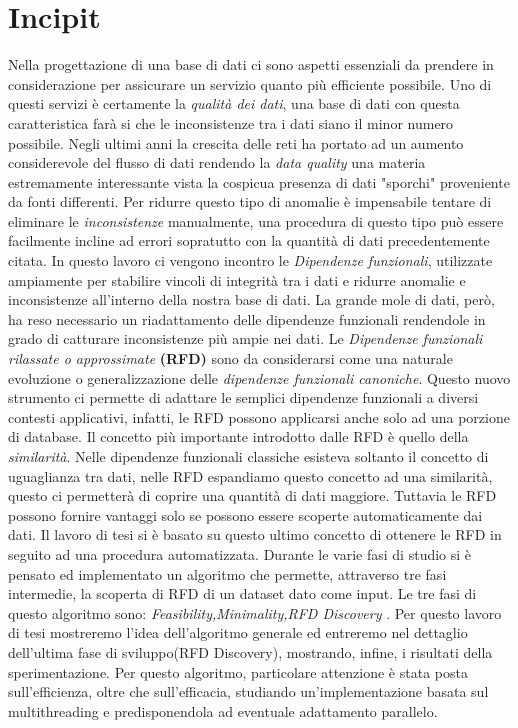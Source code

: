 \section{Incipit}
Nella progettazione di una base di dati ci sono aspetti essenziali da prendere in considerazione per assicurare un servizio quanto più efficiente possibile.
Uno di questi servizi è certamente la \emph{qualità dei dati}, una base di dati con questa caratteristica farà si che le inconsistenze tra i dati siano il minor numero possibile.
Negli ultimi anni la crescita delle reti ha portato ad un aumento considerevole del flusso di dati  rendendo la \emph{data quality} una materia estremamente interessante vista la cospicua presenza di dati "sporchi" proveniente da fonti differenti.
Per ridurre questo tipo di anomalie è impensabile tentare di eliminare le \emph{inconsistenze} manualmente,  una procedura di questo tipo può essere facilmente incline ad errori sopratutto con la quantità di dati precedentemente citata.
In questo lavoro ci vengono incontro le \emph{Dipendenze funzionali}, utilizzate ampiamente per stabilire vincoli di integrità tra i dati e ridurre anomalie e inconsistenze all'interno della nostra base di dati.
La grande mole di dati, però, ha reso necessario un riadattamento delle dipendenze funzionali rendendole in grado di catturare inconsistenze più ampie nei dati. 
Le \emph{Dipendenze funzionali rilassate o approssimate} \textbf{(RFD)} sono da considerarsi come una naturale evoluzione o generalizzazione delle \emph{dipendenze funzionali canoniche}.
Questo nuovo strumento ci permette di adattare le semplici dipendenze funzionali a diversi contesti applicativi, infatti, le RFD possono applicarsi anche solo ad una porzione di database.
Il concetto più importante introdotto dalle RFD è quello della \emph{similarità}.
Nelle dipendenze funzionali classiche esisteva soltanto il concetto di uguaglianza tra dati, nelle RFD espandiamo questo concetto ad una similarità, questo ci permetterà di coprire una quantità di dati maggiore.
Tuttavia le RFD possono fornire vantaggi solo se possono essere scoperte automaticamente dai dati.
Il lavoro di tesi si è basato su questo ultimo concetto di ottenere le RFD in seguito ad una procedura automatizzata.
Durante le varie fasi di studio si è pensato ed implementato un algoritmo che permette, attraverso tre fasi intermedie, la scoperta di RFD di un dataset dato come input.
Le tre fasi di questo algoritmo sono: \emph{Feasibility,Minimality,RFD Discovery} .
Per questo lavoro di tesi mostreremo l'idea dell'algoritmo generale ed entreremo nel dettaglio dell'ultima fase di sviluppo(RFD Discovery), mostrando, infine, i risultati della sperimentazione.
Per questo algoritmo, particolare attenzione è stata posta sull'efficienza, oltre che sull'efficacia, studiando un'implementazione basata sul multithreading e predisponendola ad eventuale adattamento parallelo.